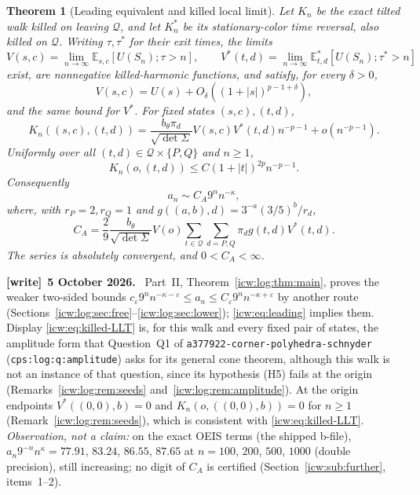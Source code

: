 \documentclass[11pt,letterpaper]{article}
\newtheorem{theorem}{Theorem}[section]
\theoremstyle{remark}\newtheorem{remark}[theorem]{Remark}
\newcommand{\eps}{\varepsilon}
\newcommand{\E}{\mathbb E}
\newcommand{\Qd}{\mathcal Q}
\newcommand{\1}{\mathbf1}
\newcommand{\dett}{\sqrt{\det\Sigma}}
\newenvironment{writenote}[1][]{\par\smallskip\begingroup\small
 \noindent\textbf{[write]}\if\relax\detokenize{#1}\relax\else~\textbf{#1.}\fi\ }%
 {\par\endgroup\smallskip}
\newcommand{\file}[1]{\textup{\nolinkurl{#1}}}
\begin{document}
\begin{theorem}[Leading equivalent and killed local limit]\label{icw:thm:main}
Let $K_n$ be the exact tilted walk killed on leaving $\Qd$, and let
$K_n^*$ be its stationary-color time reversal, also killed on $\Qd$.
Writing $\tau,\tau^*$ for their exit times, the limits
\begin{equation}\label{icw:eq:V-limit}
 V(s,c)=\lim_{n\to\infty}\E_{s,c}[U(S_n);\tau>n],\qquad
 V^*(t,d)=\lim_{n\to\infty}\E^*_{t,d}[U(S_n);\tau^*>n]
\end{equation}
exist, are nonnegative killed-harmonic functions, and satisfy, for every
$\delta>0$,
\begin{equation}\label{icw:eq:V-asymp}
 V(s,c)=U(s)+O_\delta((1+|s|)^{p-1+\delta}),
\end{equation}
and the same bound for $V^*$. For fixed states $(s,c),(t,d)$,
\begin{equation}\label{icw:eq:killed-LLT}
 K_n((s,c),(t,d))=
 \frac{b_\theta\pi_d}{\dett}V(s,c)V^*(t,d)n^{-p-1}
 +o(n^{-p-1}).
\end{equation}
Uniformly over all $(t,d)\in\Qd\times\{P,Q\}$ and $n\ge1$,
\begin{equation}\label{icw:eq:endpoint-dom}
 K_n(o,(t,d))\le C(1+|t|)^{2p}n^{-p-1}.
\end{equation}
Consequently
\begin{equation}\label{icw:eq:leading}
 a_n\sim C_A9^n n^{-\kappa},
\end{equation}
where, with $r_P=2,r_Q=1$ and
$g((a,b),d)=3^{-a}(3/5)^b/r_d$,
\begin{equation}\label{icw:eq:constant}
 \boxed{\displaystyle C_A=\frac29\frac{b_\theta}{\dett}V(o)
      \sum_{t\in\Qd}\sum_{d=P,Q}\pi_d g(t,d)V^*(t,d).}
\end{equation}
The series is absolutely convergent, and $0<C_A<\infty$.
\end{theorem}
\begin{writenote}[5 October 2026]
Part~II, Theorem~\ref{icw:log:thm:main}, proves the weaker two-sided bounds $c_\eps9^nn^{-\kappa-\eps}\le a_n\le C_\eps9^nn^{-\kappa+\eps}$ by another route (Sections~\ref{icw:log:sec:free}--\ref{icw:log:sec:lower}); \eqref{icw:eq:leading} implies them. Display \eqref{icw:eq:killed-LLT} is, for this walk and every fixed pair of states, the amplitude form that Question~Q1 of \file{a377922-corner-polyhedra-schnyder} (\texttt{cps:log:q:amplitude}) asks for its general cone theorem, although this walk is not an instance of that question, since its hypothesis (H5) fails at the origin (Remarks~\ref{icw:log:rem:seeds} and~\ref{icw:log:rem:amplitude}). At the origin endpoints $V^*((0,0),b)=0$ and $K_n(o,((0,0),b))=0$ for $n\ge1$ (Remark~\ref{icw:log:rem:seeds}), which is consistent with \eqref{icw:eq:killed-LLT}. \emph{Observation, not a claim:} on the exact OEIS terms (the shipped b-file), $a_n9^{-n}n^{\kappa}=77.91$, $83.24$, $86.55$, $87.65$ at $n=100$, $200$, $500$, $1000$ (double precision), still increasing; no digit of $C_A$ is certified (Section~\ref{icw:sub:further}, items~1--2).
\end{writenote}
\end{document}
